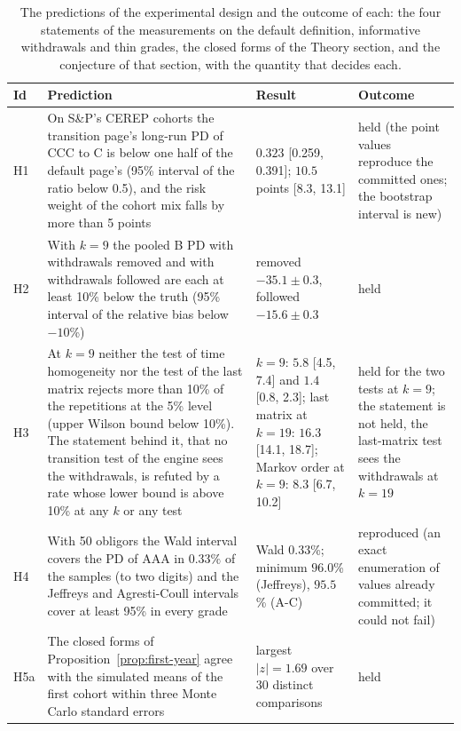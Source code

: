 \begin{table}[htbp]
\centering
\setlength{\tabcolsep}{3.5pt}
\footnotesize
\caption{The predictions of the experimental design and the outcome of each: the four statements of the measurements on the default definition, informative withdrawals and thin grades, the closed forms of the Theory section, and the conjecture of that section, with the quantity that decides each.}
\label{tab:verdicts}
\begin{tabular}{lp{5.2cm}p{4.2cm}p{2.6cm}}
\toprule
Id & Prediction & Result & Outcome \\
\midrule
\relax H1 & \relax On S\&P's CEREP cohorts the transition page's long-run PD of CCC to C is below one half of the default page's (95\% interval of the ratio below 0.5), and the risk weight of the cohort mix falls by more than 5 points & $0.323$ [0.259, 0.391]; $10.5$ points [8.3, 13.1] & \relax held (the point values reproduce the committed ones; the bootstrap interval is new) \\
\relax H2 & \relax With $k=9$ the pooled B PD with withdrawals removed and with withdrawals followed are each at least 10\% below the truth (95\% interval of the relative bias below $-10$\%) & \relax removed $-35.1\pm0.3$, followed $-15.6\pm0.3$ & \relax held \\
\relax H3 & \relax At $k=9$ neither the test of time homogeneity nor the test of the last matrix rejects more than 10\% of the repetitions at the 5\% level (upper Wilson bound below 10\%). The statement behind it, that no transition test of the engine sees the withdrawals, is refuted by a rate whose lower bound is above 10\% at any $k$ or any test & $k=9$: $5.8$ [4.5, 7.4] and $1.4$ [0.8, 2.3]; last matrix at $k=19$: $16.3$ [14.1, 18.7]; Markov order at $k=9$: $8.3$ [6.7, 10.2] & \relax held for the two tests at $k=9$; the statement is not held, the last-matrix test sees the withdrawals at $k=19$ \\
\relax H4 & \relax With 50 obligors the Wald interval covers the PD of AAA in $0.33\%$ of the samples (to two digits) and the Jeffreys and Agresti-Coull intervals cover at least 95\% in every grade & \relax Wald $0.33$\%; minimum $96.0$\% (Jeffreys), $95.5$\% (A-C) & \relax reproduced (an exact enumeration of values already committed; it could not fail) \\
\relax H5a & \relax The closed forms of Proposition~\ref{prop:first-year} agree with the simulated means of the first cohort within three Monte Carlo standard errors & \relax largest $|z|=1.69$ over 30 distinct comparisons & \relax held \\

\end{tabular}
\end{table}
